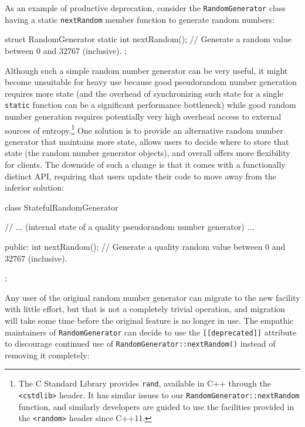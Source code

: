 As an example of productive deprecation, consider the
\lstinline!RandomGenerator! class having a static \lstinline!nextRandom!
member function to generate random numbers:

\begin{emcppslisting}
struct RandomGenerator
{
    static int nextRandom();
        // Generate a random value between 0 and 32767 (inclusive).
};
\end{emcppslisting}
    
\noindent Although such a simple random number generator can be very useful, it
might become unsuitable for heavy use because good pseudorandom number
generation requires more state (and the overhead of synchronizing such
state for a single \lstinline!static! function can be a significant
performance bottleneck) while good random number generation requires
potentially very high overhead access to external sources of
entropy.{\cprotect\footnote{The C Standard Library provides
\lstinline!rand!, available in C++ through the \lstinline!<cstdlib>! header.
It has similar issues to our \lstinline!RandomGenerator::nextRandom!
function, and similarly developers are guided to use the facilities
  provided in the \lstinline!<random>! header since C++11.}} One
solution is to provide an alternative random number generator that
maintains more state, allows users to decide where to store that state
(the random number generator objects), and overall offers more
flexibility for clients. The downside of such a change is that it comes
with a functionally distinct API, requiring that users update their code
to move away from the inferior solution:

\begin{emcppslisting}
class StatefulRandomGenerator
{
    // ... (internal state of a quality pseudorandom number generator) ...

public:
    int nextRandom();
       // Generate a quality random value between 0 and 32767 (inclusive).
};
\end{emcppslisting}
    
\noindent Any user of the original random number generator can migrate to the new
facility with little effort, but that is not a completely trivial
operation, and migration will take some time before the original feature is no
longer in use. The empathic maintainers of \lstinline!RandomGenerator! can
decide to use the
\lstinline![[deprecated]]! attribute to discourage continued use
of\linebreak%
 \lstinline!RandomGenerator::nextRandom()! instead of removing it completely:

